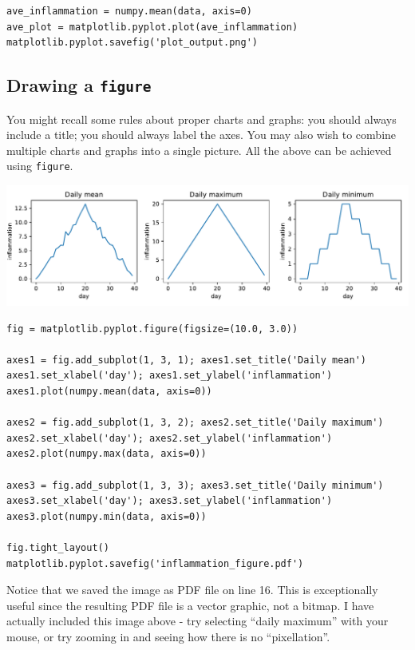 \begin{multicols*}{2}
\vspace{-4mm}
\begin{verbatim}
ave_inflammation = numpy.mean(data, axis=0)
ave_plot = matplotlib.pyplot.plot(ave_inflammation)
matplotlib.pyplot.savefig('plot_output.png')
\end{verbatim}

\subsection{Drawing a \texttt{figure}}
\label{ch3_figure}

\par
You might recall some rules about proper charts and graphs: you should always include a title; you should always label the axes. You may also wish to combine multiple charts and graphs into a single picture. All the above can be achieved using \texttt{figure}.

\includegraphics[width=\linewidth]{graphics/inflammation_figure.pdf}

\vspace{-4mm}
\begin{verbatim}
fig = matplotlib.pyplot.figure(figsize=(10.0, 3.0))

axes1 = fig.add_subplot(1, 3, 1); axes1.set_title('Daily mean')
axes1.set_xlabel('day'); axes1.set_ylabel('inflammation')
axes1.plot(numpy.mean(data, axis=0))

axes2 = fig.add_subplot(1, 3, 2); axes2.set_title('Daily maximum')
axes2.set_xlabel('day'); axes2.set_ylabel('inflammation')
axes2.plot(numpy.max(data, axis=0))

axes3 = fig.add_subplot(1, 3, 3); axes3.set_title('Daily minimum')
axes3.set_xlabel('day'); axes3.set_ylabel('inflammation')
axes3.plot(numpy.min(data, axis=0))

fig.tight_layout()
matplotlib.pyplot.savefig('inflammation_figure.pdf')
\end{verbatim}

Notice that we saved the image as PDF file on line 16. This is exceptionally useful since the resulting PDF file is a vector graphic, not a bitmap. I have actually included this image above - try selecting ``daily maximum'' with your mouse, or try zooming in and seeing how there is no ``pixellation''.

\end{multicols*}